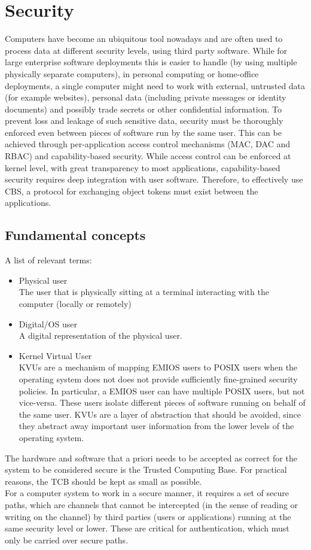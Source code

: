 \section{Security}
Computers have become an ubiquitous tool nowadays and are often used to process data at different security levels, using third party software. While for large enterprise software deployments this is easier to handle (by using multiple physically separate computers), in personal computing or home-office deployments, a single computer might need to work with external, untrusted data (for example websites), personal data (including private messages or identity documents) and possibly trade secrets or other confidential information. To prevent loss and leakage of such sensitive data, security must be thoroughly enforced even between pieces of software run by the same user. This can be achieved through per-application access control mechanisms (MAC, DAC and RBAC) and capability-based security. While access control can be enforced at kernel level, with great transparency to most applications, capability-based security requires deep integration with user software. Therefore, to effectively use CBS, a protocol for exchanging object tokens must exist between the applications.
\subsection{Fundamental concepts}
A list of relevant terms:
\begin{itemize}
	\item Physical user\\
	The user that is physically sitting at a terminal interacting with the computer (locally or remotely)
	\item Digital/OS user\\
	A digital representation of the physical user.
	\item Kernel Virtual User\\
	KVUs are a mechanism of mapping EMIOS users to POSIX users when the operating system does not does not provide sufficiently fine-grained security policies. In particular, a EMIOS user can have multiple POSIX users, but not vice-versa. These users isolate different pieces of software running on behalf of the same user. KVUs are a layer of abstraction that should be avoided, since they abstract away important user information from the lower levels of the operating system.
\end{itemize}
The hardware and software that a priori needs to be accepted as correct for the system to be considered secure is the Trusted Computing Base. For practical reasons, the TCB should be kept as small as possible.\\
For a computer system to work in a secure manner, it requires a set of secure paths, which are channels that cannot be intercepted (in the sense of reading or writing on the channel) by third parties (users or applications) running at the same security level or lower. These are critical for authentication, which must only be carried over secure paths.\\
